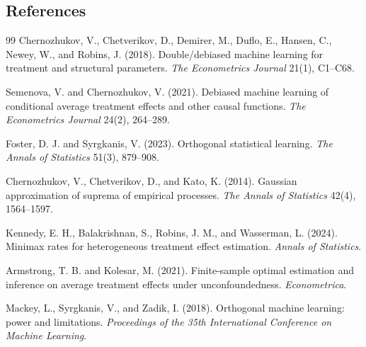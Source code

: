 \documentclass[11pt]{article}
\theoremstyle{definition}
\theoremstyle{plain}
\theoremstyle{remark}
\begin{document}
\subsection*{References}
\begin{thebibliography}{99}
Chernozhukov, V., Chetverikov, D., Demirer, M., Duflo, E.,
Hansen, C., Newey, W., and Robins, J. (2018).
Double/debiased machine learning for treatment and structural parameters.
\emph{The Econometrics Journal} 21(1), C1--C68.

Semenova, V. and Chernozhukov, V. (2021).
Debiased machine learning of conditional average treatment effects and other
causal functions.
\emph{The Econometrics Journal} 24(2), 264--289.

Foster, D. J. and Syrgkanis, V. (2023).
Orthogonal statistical learning.
\emph{The Annals of Statistics} 51(3), 879--908.

Chernozhukov, V., Chetverikov, D., and Kato, K. (2014).
Gaussian approximation of suprema of empirical processes.
\emph{The Annals of Statistics} 42(4), 1564--1597.

Kennedy, E. H., Balakrishnan, S., Robins, J. M., and Wasserman, L. (2024).
Minimax rates for heterogeneous treatment effect estimation.
\emph{Annals of Statistics}.

Armstrong, T. B. and Kolesar, M. (2021).
Finite-sample optimal estimation and inference on average treatment effects
under unconfoundedness.
\emph{Econometrica}.

Mackey, L., Syrgkanis, V., and Zadik, I. (2018).
Orthogonal machine learning: power and limitations.
\emph{Proceedings of the 35th International Conference on Machine Learning}.
\end{thebibliography}
\end{document}
